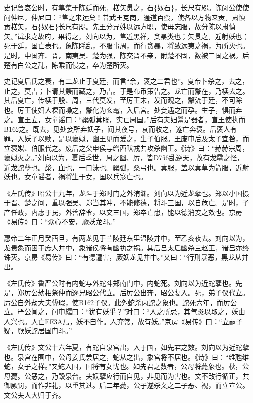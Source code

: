 \documentclass[]{article}
\begin{document}
史记鲁哀公时，有隼集于陈廷而死，楛矢贯之，石\{奴石\}，长尺有咫。陈闵公使使问仲尼，仲尼曰：``隼之来远矣！昔武王克商，通道百蛮，使各以方物来贡，肃慎贡楛矢，石\{奴石\}长尺有咫。先王分异姓以远方职，使毋忘服，故分陈以肃慎矢。''试求之故府，果得之。刘向以为，隼近黑祥，贪暴类也；矢贯之，近射妖也；死于廷，国亡表也。象陈眊乱，不服事周，而行贪暴，将致远夷之祸，为所灭也。是时，中国齐、晋，南夷吴、楚为强，陈交晋不亲，附楚不固，数被二国之祸。后楚有白公之乱，陈乘而侵之，卒为楚所灭。

史记夏后氏之衰，有二龙止于夏廷，而言``余，褒之二君也''。夏帝卜杀之，去之，止之，莫吉；卜请其漦而藏之，乃吉。于是布币策告之。龙亡而漦在，乃椟去之。其后夏亡，传椟于殷、周，三代莫发，至厉王末，发而观之，漦流于廷，不可除也。厉王使妇人裸而噪之，漦化为玄鼋，入后宫。处妾遇之而孕。生子，惧而弃之。宣王立，女童谣曰：``檿弧萁服，实亡周国。''后有夫妇鬻是器者，宣王使执而B162之。既去，见处妾所弃妖子，闻其夜号，哀而收之，遂亡奔褒。后褒人有罪，入妖子以赎，是以褒姒，幽王见而爱之，生子伯服。王废申后及太子宜咎，而立褒姒、伯服代之。废后之父申侯与缯西畎戎共攻杀幽王。《诗》曰：``赫赫宗周，褒姒灭之。''刘向以为，夏后季世，周之幽、厉，皆D766乱逆天，故有龙鼋之怪，近龙蛇孽也。漦，血也，一曰沫也。檿弧，桑弓也。萁服，盖以萁草为箭服，近射妖也。女童谣者，祸将生于女，国以兵寇亡也。

《左氏传》昭公十九年，龙斗于郑时门之外洧渊。刘向以为近龙孽也。郑以小国摄于晋、楚之间，重以强吴、郑当其冲，不能修德，将斗三国，以自危亡。是时，子产任政，内惠于民，外善辞令，以交三国，郑卒亡患，能以德消变之效也。京房《易传》曰：``众心不安，厥妖龙斗。''

惠帝二年正月癸酉旦，有两龙见于兰陵廷东里温陵井中，至乙亥夜去。刘向以为，龙贵象而困于庶人井中，象诸侯将有幽执之祸。其后吕太后幽杀三赵王，诸吕亦终诛灭。京房《易传》曰：``有德遭害，厥妖龙见井中。''又曰：``行刑暴恶，黑龙从井出。

《左氏传》鲁严公时有内蛇与外蛇斗郑南门中，内蛇死。刘向以为近蛇孽也。先是，郑厉公劫相祭仲而逐兄昭公代立。后厉公出奔，昭公复入。死，弟子仪代立。厉公自外劫大夫傅瑕，使B162子仪。此外蛇杀内蛇之象也。蛇死六年，而厉公立。严公闻之，问申繻曰：``犹有妖乎？''对曰：``人之所忌，其气炎以取之，妖由人兴也。人亡EE3A焉，妖不自作。人弃常，故有妖。''京房《易传》曰：``立嗣子疑，厥妖蛇居国门斗。''

《左氏传》文公十六年夏，有蛇自泉宫出，入于国，如先君之数。刘向以为近蛇孽也。泉宫在囿中，公母姜氏尝居之，蛇从之出，象宫将不居也。《诗》曰：``维虺维蛇，女子之祥。''又蛇入国，国将有女忧也。如先君之数者，公母将薨象也。秋，公母薨。公恶之，乃毁泉台。夫妖孽应行而自见，非见而为害也。文不改行循正，共御厥罚，而作非礼，以重其过。后二年薨，公子遂杀文之二子恶、视，而立宣公。文公夫人大归于齐。
\end{document}
